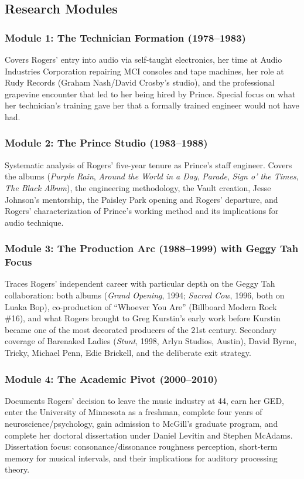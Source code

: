 \documentclass[11pt,letterpaper]{article}
\begin{document}
\subsection{Research Modules}

\subsubsection{Module 1: The Technician Formation (1978--1983)}
Covers Rogers' entry into audio via self-taught electronics, her time at Audio Industries Corporation repairing MCI consoles and tape machines, her role at Rudy Records (Graham Nash/David Crosby's studio), and the professional grapevine encounter that led to her being hired by Prince. Special focus on what her technician's training gave her that a formally trained engineer would not have had.

\subsubsection{Module 2: The Prince Studio (1983--1988)}
Systematic analysis of Rogers' five-year tenure as Prince's staff engineer. Covers the albums (\textit{Purple Rain}, \textit{Around the World in a Day}, \textit{Parade}, \textit{Sign o' the Times}, \textit{The Black Album}), the engineering methodology, the Vault creation, Jesse Johnson's mentorship, the Paisley Park opening and Rogers' departure, and Rogers' characterization of Prince's working method and its implications for audio technique.

\subsubsection{Module 3: The Production Arc (1988--1999) with Geggy Tah Focus}
Traces Rogers' independent career with particular depth on the Geggy Tah collaboration: both albums (\textit{Grand Opening}, 1994; \textit{Sacred Cow}, 1996, both on Luaka Bop), co-production of ``Whoever You Are'' (Billboard Modern Rock \#16), and what Rogers brought to Greg Kurstin's early work before Kurstin became one of the most decorated producers of the 21st century. Secondary coverage of Barenaked Ladies (\textit{Stunt}, 1998, Arlyn Studios, Austin), David Byrne, Tricky, Michael Penn, Edie Brickell, and the deliberate exit strategy.

\subsubsection{Module 4: The Academic Pivot (2000--2010)}
Documents Rogers' decision to leave the music industry at 44, earn her GED, enter the University of Minnesota as a freshman, complete four years of neuroscience/psychology, gain admission to McGill's graduate program, and complete her doctoral dissertation under Daniel Levitin and Stephen McAdams. Dissertation focus: consonance/dissonance roughness perception, short-term memory for musical intervals, and their implications for auditory processing theory.
\end{document}
